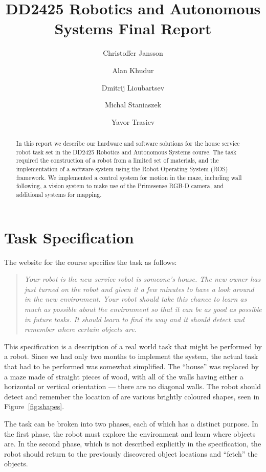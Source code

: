 \documentclass[10pt,a4paper,twocolumn]{article}
\author{Christoffer Jansson \and Alan Khudur \and Dmitrij Lioubartsev \and Michal Staniaszek \and Yavor Trasiev}
\title{DD2425 Robotics and Autonomous Systems Final Report}
\begin{document}
\maketitle
\begin{abstract}
  In this report we describe our hardware and software solutions for the house
  service robot task set in the DD2425 Robotics and Autonomous Systems course.
  The task required the construction of a robot from a limited set of materials,
  and the implementation of a software system using the Robot Operating System
  (ROS)\cite{rosorg} framework. We implemented a control system for motion in
  the maze, including wall following, a vision system to make use of the
  Primesense RGB-D camera, and additional systems for mapping.
\end{abstract}
\section{Task Specification}
The website for the course specifies the task as follows:
\begin{quote}
  \emph{Your robot is the new service robot is someone's house. The new owner has just
  turned on the robot and given it a few minutes to have a look around in the
  new environment. Your robot should take this chance to learn as much as
  possible about the environment so that it can be as good as possible in future
  tasks. It should learn to find its way and it should detect and remember where
  certain objects are.}
\end{quote}
This specification is a description of a real world task that might be performed
by a robot. Since we had only two months to implement the system, the actual
task that had to be performed was somewhat simplified. The ``house'' was
replaced by a maze made of straight pieces of wood, with all of the walls having
either a horizontal or vertical orientation --- there are no diagonal walls. The
robot should detect and remember the location of are various brightly coloured
shapes, seen in Figure~\ref{fig:shapes}.

The task can be broken into two phases, each of which has a distinct purpose. In
the first phase, the robot must explore the environment and learn where objects
are. In the second phase, which is not described explicitly in the
specification, the robot should return to the previously discovered object
locations and ``fetch'' the objects.
\end{document}
